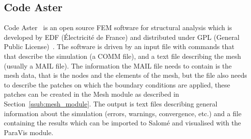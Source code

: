 

\subsection{Code Aster} %
\label{sub:code_aster}
Code Aster~\cite{codeaster} is an open source FEM software for structural analysis which is developed by EDF (Électricité de France) and distributed under GPL (General Public License)~\cite{gpl}. The software is driven by an input file with commands that that describe the simulation (a COMM file), and a text file describing the mesh (usually a MAIL file). The information the MAIL file needs to contain is the mesh data, that is the nodes and the elements of the mesh, but the file also needs to describe the patches on which the boundary conditions are applied, these patches can be created in the Mesh module as described in Section~\ref{ssub:mesh_module}. The output is text files describing general information about the simulation (errors, warnings, convergence, etc.) and a file containing the results which can be imported to Salomé and visualised with the ParaVis module. 


